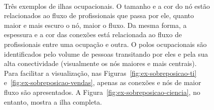 \documentclass[
  article,
  11pt,
  a4paper,
  english,
  brazil,
  sumario=tradicional]{abntex2}
\begin{document}
\begin{figure}[ht]
    \centering
    \\    
    \caption{Três exemplos de ilhas ocupacionais. O tamanho e a cor do nó estão relacionados ao fluxo de profissionais que passa por ele, quanto maior e mais escuro o nó, maior o fluxo. Da mesma forma, a espessura e a cor das conexões está relacionada ao fluxo de profissionais entre uma ocupação e outra. O polos ocupacionais são identificados pelo volume de pessoas transitando por eles e pela sua alta conectividade (visualmente os nós maiores e mais centrais). Para facilitar a visualização, nas Figuras~\ref{fig:ex-sobreposicao-ti} e~\ref{fig:ex-sobreposicao-vendas}, apenas as conexões e nós de maior fluxo são apresentados. A Figura~\ref{fig:ex-sobreposicao-ciencia}, no entanto, mostra a ilha completa.}
    \label{fig:ex-ilhas-ocupacionais}
\end{figure}
\end{document}
